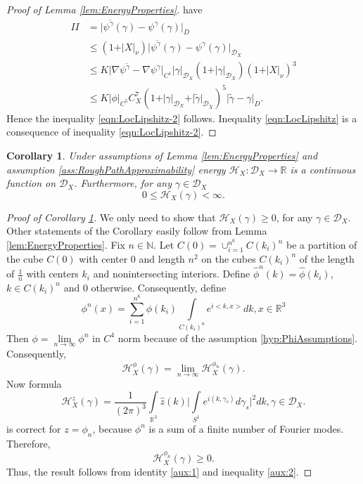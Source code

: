 \documentclass[11pt,a4paper,leqno]{amsart}%
\theoremstyle{plain}
\theoremstyle{remark}
\theoremstyle{plain}
\newtheorem{corollary}[theorem]{Corollary}
\numberwithin{equation}{section}
\def\Rnu{{\mathbb R}}
\def\suml{\sum\limits}
\def\intl{\int\limits}
\begin{document}
\begin{proof}[ Proof of Lemma \ref{lem:EnergyProperties}]
have
\begin{align}
II&=\vert \psi^{\tilde{\gamma}}(\gamma)-\psi^{\gamma}(\gamma)\vert_D\nonumber\\
&\leq
(1+\vert X\vert_{\nu})\vert \psi^{\tilde{\gamma}}(\gamma)-\psi^{\gamma}(\gamma)\vert_{\mathcal{D}_X}\nonumber\\
&\leq K\vert \nabla\psi^{\tilde{\gamma}}-\nabla\psi^{\gamma}\vert_{C^1}
\vert \gamma\vert_{\mathcal{D}_X}(1+\vert \gamma\vert_{\mathcal{D}_X})(1+\vert X\vert_{\nu})^3
\nonumber\\
&\leq K\vert \phi\vert_{C^5}C_X^7(1+\vert \gamma\vert_{\mathcal{D}_X}+\vert \tilde{\gamma}\vert_{\mathcal{D}_{\tilde{X}}})^5
\vert \tilde{\gamma}-\gamma\vert_D.\label{eqn:EnergyLocLip-9}
\end{align}
Hence the inequality \eqref{eqn:LocLipshitz-2} follows. Inequality
\eqref{eqn:LocLipshitz} is a consequence of inequality
\eqref{eqn:LocLipshitz-2}.
\end{proof}
\begin{corollary}\label{cor:ContinuityEnergy}
Under assumptions of Lemma \ref{lem:EnergyProperties} and
assumption \ref{ass:RoughPathApproximability} energy
$\mathcal{H}_X:\mathcal{D}_X\to\Rnu$ is a continuous function on
$\mathcal{D}_X$. Furthermore, for any $\gamma\in\mathcal{D}_X$
$$
0\leq\mathcal{H}_X(\gamma)<\infty.
$$
\end{corollary}
\begin{proof}[Proof of Corollary \ref{cor:ContinuityEnergy}]
We only need to show that $\mathcal{H}_X(\gamma)\geq 0$, for any
$\gamma\in\mathcal{D}_X$. Other statements of the Corollary easily
follow from Lemma \ref{lem:EnergyProperties}.
Fix $n\in \mathbb{N}$.
Let $C(0)=\cup_{i=1}^{n^6}C(k_i)^n$ be a partition of the cube $C(0)$ with center $0$ and length $n^2$ on the cubes $C(k_i)^n$ of the length of $\frac{1}{n}$ with centers $k_i$ and nonintersecting interiors. Define $\hat{\phi}^n(k)=\hat{\phi}(k_i)$, $k\in C(k_i)^n$ and $0$ otherwise. Consequently, define
\[
\phi^n(x)=\suml_{i=1}^{n^6}\hat{\phi}(k_i)\int\limits_{C(k_i)^n}e^{i<k,x>}dk,x\in\mathbb{R}^3
\]
Then $\phi=\lim\limits_{n\to\infty}\phi^n$ in $C^4$ norm because of the assumption \ref{hyp:PhiAssumptions}.
Consequently,
\begin{equation}
\mathcal{H}_X^{\phi}(\gamma)=\lim\limits_{n\to\infty}\mathcal{H}_X^{\phi_n}(\gamma).\label{aux:1}
\end{equation}
Now formula
\begin{equation}
\mathcal{H}_X^{z}(\gamma)=\frac{1}{(2\pi)^3}\intl_{\Rnu^3}\hat{z}(k)\Big\vert \intl_{S^1}e^{i(k,\gamma_s)}d\gamma_s\Big\vert^2dk,\gamma\in
\mathcal{D}_X.\label{eqn:EnergyIntegralRepr-1}
\end{equation}
is correct for $z=\phi_n$, because $\phi^n$ is a sum of a finite number of Fourier modes. Therefore,
\begin{equation}
\mathcal{H}_X^{\phi_n}(\gamma)\geq 0.\label{aux:2}
\end{equation}
Thus, the  result follows from identity \eqref{aux:1} and inequality \eqref{aux:2}.
\end{proof}
\end{document}
